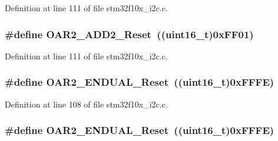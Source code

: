 Definition at line 111 of file stm32f10x\+\_\+i2c.\+c.

\subsubsection[{\texorpdfstring{O\+A\+R2\+\_\+\+A\+D\+D2\+\_\+\+Reset}{OAR2_ADD2_Reset}}]{\setlength{\rightskip}{0pt plus 5cm}\#define O\+A\+R2\+\_\+\+A\+D\+D2\+\_\+\+Reset~(({\bf uint16\+\_\+t})0x\+F\+F01)}\hypertarget{group___i2_c___private___defines_ga243036db699954e290f48e6743323054}{}\label{group___i2_c___private___defines_ga243036db699954e290f48e6743323054}


Definition at line 111 of file stm32f10x\+\_\+i2c.\+c.

\subsubsection[{\texorpdfstring{O\+A\+R2\+\_\+\+E\+N\+D\+U\+A\+L\+\_\+\+Reset}{OAR2_ENDUAL_Reset}}]{\setlength{\rightskip}{0pt plus 5cm}\#define O\+A\+R2\+\_\+\+E\+N\+D\+U\+A\+L\+\_\+\+Reset~(({\bf uint16\+\_\+t})0x\+F\+F\+F\+E)}\hypertarget{group___i2_c___private___defines_gaae86eb7689c73e34388cfbd03b8d9ecd}{}\label{group___i2_c___private___defines_gaae86eb7689c73e34388cfbd03b8d9ecd}


Definition at line 108 of file stm32f10x\+\_\+i2c.\+c.

\subsubsection[{\texorpdfstring{O\+A\+R2\+\_\+\+E\+N\+D\+U\+A\+L\+\_\+\+Reset}{OAR2_ENDUAL_Reset}}]{\setlength{\rightskip}{0pt plus 5cm}\#define O\+A\+R2\+\_\+\+E\+N\+D\+U\+A\+L\+\_\+\+Reset~(({\bf uint16\+\_\+t})0x\+F\+F\+F\+E)}\hypertarget{group___i2_c___private___defines_gaae86eb7689c73e34388cfbd03b8d9ecd}{}\label{group___i2_c___private___defines_gaae86eb7689c73e34388cfbd03b8d9ecd}


